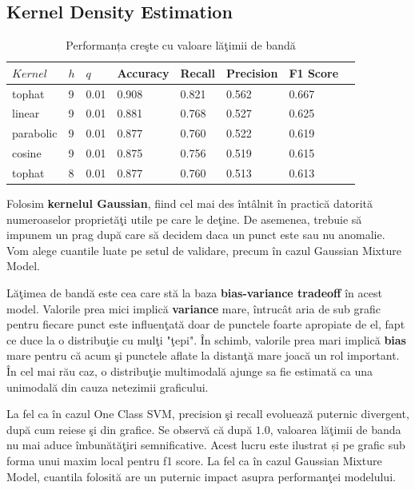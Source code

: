 \subsection{Kernel Density Estimation}

\begin{table}[H]
  \centering
  \begin{tabularx}{\textwidth}{
      |X
      |X
      |X
      |X
      |X
      |X
      |X
      |X|
  }
  \hline
  $Kernel$ & $h$ & $q$ & {Accuracy} & {Recall} & {Precision} & {F1 Score} \\
  \hline
  \rowcolor{gray!20} tophat	& 9	& 0.01 & 0.908 & 0.821 & 0.562 & 0.667  \\
  linear & 9 & 0.01	& 0.881 & 0.768	& 0.527 & 0.625 \\
  \rowcolor{gray!20} parabolic & 9 & 0.01 & 0.877 & 0.760 & 0.522 & 0.619  \\
  cosine & 9 & 0.01	& 0.875 & 0.756	& 0.519 & 0.615 \\
  \rowcolor{gray!20} tophat	& 8	& 0.01 & 0.877 & 0.760 & 0.513 & 0.613 \\
  \hline
  \end{tabularx}
  \caption{Performanța creşte cu valoare lăţimii de bandă}
\end{table}

Folosim \textbf{kernelul Gaussian}, fiind cel mai des întâlnit în practică
datorită numeroaselor proprietăţi utile pe care le deţine. De asemenea, trebuie 
să impunem un prag după care să decidem daca un punct este sau nu anomalie. 
Vom alege cuantile luate pe setul de validare, precum în cazul 
Gaussian Mixture Model.

Lăţimea de bandă este cea care stă la baza \textbf{bias-variance tradeoff} 
în acest model.
Valorile prea mici implică \textbf{variance} mare, întrucât aria de sub grafic 
pentru fiecare punct este influenţată doar de punctele foarte apropiate de el, 
fapt ce duce la o distribuţie cu mulţi "ţepi". 
În schimb, valorile prea mari implică \textbf{bias} mare pentru că acum şi punctele 
aflate la distanţă mare joacă un rol important. În cel mai rău caz, o distribuţie 
multimodală ajunge sa fie estimată ca una unimodală din cauza netezimii graficului.

La fel ca în cazul One Class SVM, precision şi recall evoluează puternic
divergent, după cum reiese şi din grafice. 
Se observă că după $1.0$, valoarea lăţimii de banda nu mai aduce îmbunătăţiri 
semnificative. Acest lucru este ilustrat și pe grafic sub forma unui maxim local 
pentru f1 score. La fel ca în cazul Gaussian Mixture Model, cuantila 
folosită are un puternic impact asupra performanţei modelului.

